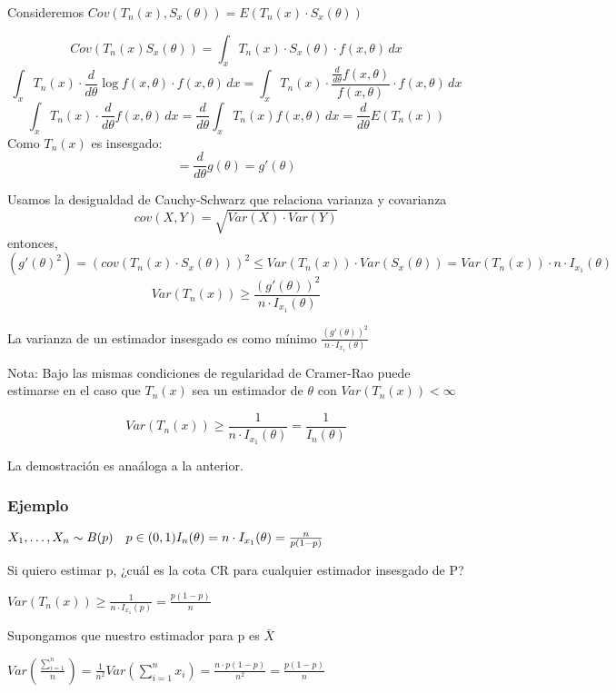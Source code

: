 \begin{proofs}
    Consideremos $Cov(T_n(x),S_x(\theta))=E(T_n(x)\cdot S_x(\theta))$

\[
Cov(T_n(x)S_x(\theta))=\int_x T_n(x) \cdot S_x(\theta) \cdot f(x,\theta) \,dx
\]\[
\int_x T_n(x) \cdot \frac{d}{d \theta} \log f(x,\theta) \cdot f(x,\theta) \,dx
=\int_x T_n(x) \cdot \frac{\frac{d}{d \theta} f(x,\theta)}{f(x,\theta)} \cdot f(x,\theta) \,dx
\]\[
\int_x T_n(x) \cdot \frac{d}{d \theta} f(x,\theta)\,dx
= \frac{d}{d \theta} \int_x T_n(x) f(x,\theta) \,dx
=\frac{d}{d \theta} E(T_n(x))
\]
Como $T_n(x)$ es insesgado:
\[
=\frac{d}{d \theta} g(\theta)=g'(\theta)
\]

Usamos la desigualdad de Cauchy-Schwarz que relaciona varianza y covarianza
\[
cov(X,Y)=\sqrt{Var(X) \cdot Var(Y)}
\]
entonces,
\[
(g'(\theta)^2)=(cov(T_n(x)\cdot S_x(\theta)))^2 \leq Var(T_n(x)) \cdot Var(S_x(\theta))
=Var(T_n(x)) \cdot n \cdot I_{x_1}(\theta)
\]
\[
    Var(T_n(x)) \geq \frac{(g'(\theta))^2}{n \cdot I_{x_1}(\theta)}
\]

\end{proofs}

La varianza de un estimador insesgado es como mínimo $\frac{(g'(\theta))^2}{n \cdot I_{x_1}(\theta)}$

Nota: Bajo las mismas condiciones de regularidad de Cramer-Rao puede estimarse
en el caso que $T_n(x)$ sea un estimador de $\theta$ con $Var(T_n(x))<\infty$

\[
    Var(T_n(x)) \geq \frac{1}{n \cdot I_{x_1}(\theta)}= \frac{1}{I_n(\theta)}
\]


La demostración es anaáloga a la anterior.

\subsubsection*{Ejemplo}


\(
X_1,\dots,X_n \sim B(p) \quad p \in (0,1)
\\I_n(\theta)=n \cdot I_{x_1}(\theta)=\frac{n}{p(1-p)}
\)

Si quiero estimar p, ¿cuál es la cota CR para cualquier estimador insesgado de P?

\(
Var(T_n(x)) \geq \frac{1}{n \cdot I_{x_1}(p)}=\frac{p(1-p)}{n}
\)

Supongamos que nuestro estimador para p es $\bar{X}$

$Var(\frac{\sum_{i=1}^{n}}{n})=\frac{1}{n^2}Var(\sum_{i=1}^{n} x_i)
    =\frac{n \cdot p(1-p)}{n^2}=\frac{p(1-p)}{n}$


